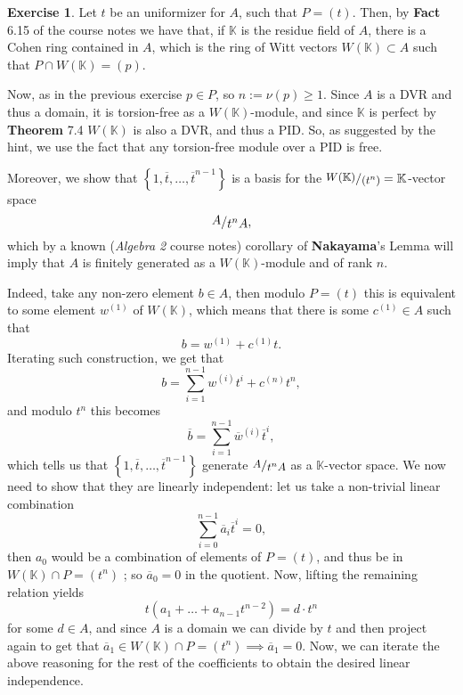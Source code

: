 \documentclass[a4paper]{article}
\newcommand{\K}{\mathbb{K}}
\newcommand{\ssfrac}[2]{
    \raisebox{+0.3ex}{$#1$}
    /
    \raisebox{-0.3ex}{$#2$}
}
\newcommand{\sfrac}[2]{
    \raisebox{+0.3ex}{\scalebox{0.9}{$#1$}}
    /
    \raisebox{-0.3ex}{\scalebox{0.9}{$#2$}}
}
\theoremstyle{definition}
\theoremstyle{definition}
\theoremstyle{remark}
\theoremstyle{definition}
\newtheorem{exercise}{Exercise}[section]
\begin{document}
\begin{exercise}
	Let $t$ be an uniformizer for $A$, such that $P=(t)$. Then, by \textbf{Fact} 6.15 of the course notes we have that, if $\K$ is the residue field of $A$, there is a
	Cohen ring contained in $A$, which is the ring of Witt vectors $W(\K)\subset A$ such that $P\cap W(\K)=(p)$.

	Now, as in the previous exercise $p\in P$, so $n:=\nu(p)\geq 1$. Since $A$ is a DVR and thus a domain, it is torsion-free as a $W(\K)$-module, and since $\K$ is perfect by
	\textbf{Theorem} 7.4 $W(\K)$ is also a DVR, and thus a PID. So, as suggested by the hint, we use the fact that any torsion-free module over a PID is free.

	Moreover, we show that $\left\{ 1,\overline{t},\dots,\overline{t}^{n-1} \right\}$ is a basis for the $\sfrac{W(\K)}{(t^n)}=\K$-vector space $$\ssfrac{A}{t^n A},$$ which by
	a known (\textit{Algebra 2} course notes) corollary of \textbf{Nakayama}'s Lemma will imply
that $A$ is finitely generated as a $W(\K)$-module and of rank $n$.

Indeed, take any non-zero element $b\in A$, then modulo $P=(t)$ this is equivalent to some element $w^{(1)}$ of $W(\K)$, which means that there is some $c^{(1)}\in A$
such that
$$ b=w^{(1)}+c^{(1)} t .$$
Iterating such construction, we get that $$ b=\sum_{i=1}^{n-1}{w^{(i)} t^i}+c^{(n)} t^n,$$
and modulo $t^n$ this becomes $$\overline{b}=\sum_{i=1}^{n-1}{\overline{w}^{(i)}\overline{t}^i},$$ which tells us that $\left\{ 1,\overline{t},\dots,\overline{t}^{n-1}
\right\}$ generate $\sfrac{A}{t^n A}$ as a $\K$-vector space.
We now need to show that they are linearly independent: let us take a non-trivial linear combination
$$ \sum_{i=0}^{n-1}{\overline{a}_i\overline{t}^i }=0,$$ then $a_0$ would be a combination of elements of $P=(t)$, and thus be in $W(\K)\cap P=(t^n)$ ; so $\overline{a}_0=0$ in the
quotient. Now, lifting the remaining relation yields $$ t(a_1 +\dots+ a_{n-1} t^{n-2})=d\cdot t^n $$ for some $d\in A$, and since $A$ is a domain we can divide by $t$ and then
project again to get that $\overline{a}_1\in W(\K)\cap P=(t^n)\implies \overline{a}_1=0$. Now, we can iterate the above reasoning for the rest of the coefficients to obtain the desired linear
independence.
\end{exercise}
\end{document}
